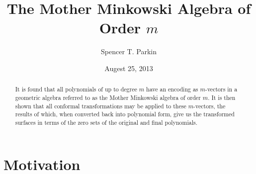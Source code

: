 \documentclass{birkjour}
\theoremstyle{definition}
\theoremstyle{remark}
\numberwithin{equation}{section}
\begin{document}
%
%
%
%
%
%
%
%

\title{The Mother Minkowski Algebra of Order $m$}

\author{Spencer T. Parkin}
\address{102 W. 500 S., Salt Lake City, UT  84101}


\date{Augest 25, 2013}


\begin{abstract}
It is found that all polynomials of up to degree $m$
have an encoding as $m$-vectors in a geometric algebra referred
to as the Mother Minkowski algebra of order $m$.
It is then shown that all conformal transformations may be
applied to these $m$-vectors, the results of which, when converted
back into polynomial form, give us the transformed surfaces in terms
of the zero sets of the original and final polynomials.
\end{abstract}

\maketitle

\section{Motivation}
\end{document}

